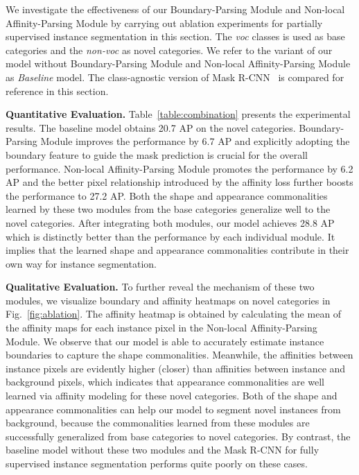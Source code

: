 \documentclass[runningheads]{llncs}
\begin{document}
We investigate the effectiveness of our Boundary-Parsing Module and Non-local Affinity-Parsing Module by carrying out ablation experiments for partially supervised instance segmentation in this section.
The \emph{voc} classes is used as base categories and the \emph{non-voc} as novel categories.  
We refer to the variant of our model without Boundary-Parsing Module and Non-local Affinity-Parsing Module as \emph{Baseline} model. 
The class-agnostic version of Mask R-CNN~\cite{hu2018learning} is compared for reference in this section. 

\smallskip\noindent\textbf{Quantitative Evaluation.} Table~\ref{table:combination} presents the experimental results. 
The baseline model obtains 20.7 AP on the novel categories. Boundary-Parsing Module improves the performance by 6.7 AP and explicitly adopting the boundary feature to guide the mask prediction is crucial for the overall performance. Non-local Affinity-Parsing Module promotes the performance by 6.2 AP and the better pixel relationship introduced by the affinity loss further boosts the performance to 27.2 AP.
Both the shape and appearance commonalities learned by these two modules from the base categories generalize well to the novel categories. After integrating both modules, our model  achieves  28.8 AP which is distinctly better than the performance by each individual module. It implies that the learned shape and appearance commonalities contribute in their own way for instance segmentation.


\smallskip\noindent\textbf{Qualitative Evaluation.} To further reveal the mechanism of these two modules, we visualize boundary and affinity heatmaps on novel categories in Fig.~\ref{fig:ablation}. The affinity heatmap is obtained by calculating the mean of the affinity maps for each instance pixel in the Non-local Affinity-Parsing Module. We observe that our model is able to accurately estimate instance boundaries to capture the shape commonalities. Meanwhile, the affinities between instance pixels are evidently higher (closer) than affinities between instance and background pixels, which indicates that appearance commonalities are well learned via affinity modeling for these novel categories. 
Both of the shape and appearance commonalities can help our model to segment novel instances from  background, because the commonalities learned from these modules are successfully generalized from base categories to novel categories. By contrast, the baseline model without these two modules and the Mask R-CNN for fully supervised instance segmentation performs quite poorly on these cases.
\end{document}
